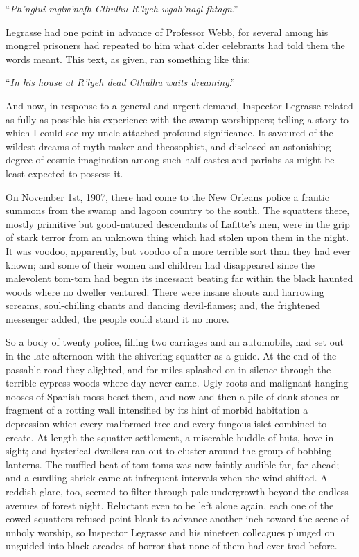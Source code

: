 \begin{pages}
\begin{Leftside}
``\emph{Ph'nglui mglw'nafh Cthulhu R'lyeh wgah'nagl fhtagn}.''

Legrasse had one point in advance of Professor Webb, for several among
his mongrel prisoners had repeated to him what older celebrants had told
them the words meant. This text, as given, ran something like this:

``\emph{In his house at R'lyeh dead Cthulhu waits dreaming}.''

And now, in response to a general and urgent demand, Inspector Legrasse
related as fully as possible his experience with the swamp worshippers;
telling a story to which I could see my uncle attached profound
significance. It savoured of the wildest dreams of myth-maker and
theosophist, and disclosed an astonishing degree of cosmic imagination
among such half-castes and pariahs as might be least expected to possess
it.

On November 1st, 1907, there had come to the New Orleans police a
frantic summons from the swamp and lagoon country to the south. The
squatters there, mostly primitive but good-natured descendants of
Lafitte's men, were in the grip of stark terror from an unknown thing
which had stolen upon them in the night. It was voodoo, apparently, but
voodoo of a more terrible sort than they had ever known; and some of
their women and children had disappeared since the malevolent tom-tom
had begun its incessant beating far within the black haunted woods where
no dweller ventured. There were insane shouts and harrowing screams,
soul-chilling chants and dancing devil-flames; and, the frightened
messenger added, the people could stand it no more.

So a body of twenty police, filling two carriages and an automobile, had
set out in the late afternoon with the shivering squatter as a guide. At
the end of the passable road they alighted, and for miles splashed on in
silence through the terrible cypress woods where day never came. Ugly
roots and malignant hanging nooses of Spanish moss beset them, and now
and then a pile of dank stones or fragment of a rotting wall intensified
by its hint of morbid habitation a depression which every malformed tree
and every fungous islet combined to create. At length the squatter
settlement, a miserable huddle of huts, hove in sight; and hysterical
dwellers ran out to cluster around the group of bobbing lanterns. The
muffled beat of tom-toms was now faintly audible far, far ahead; and a
curdling shriek came at infrequent intervals when the wind shifted. A
reddish glare, too, seemed to filter through pale undergrowth beyond the
endless avenues of forest night. Reluctant even to be left alone again,
each one of the cowed squatters refused point-blank to advance another
inch toward the scene of unholy worship, so Inspector Legrasse and his
nineteen colleagues plunged on unguided into black arcades of horror
that none of them had ever trod before.


\end{Leftside}
\end{pages}
